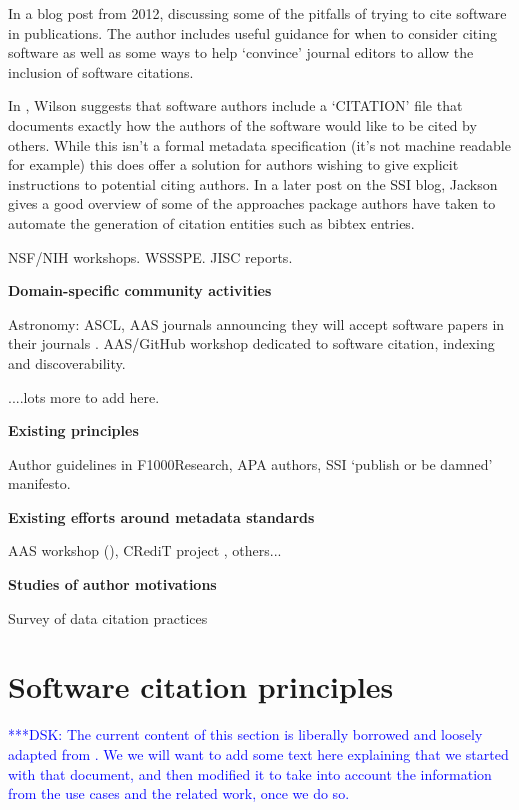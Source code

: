 \documentclass[11pt, oneside]{amsart}
\newcommand{\katznote}[1]{ {\textcolor{blue} { ***DSK: #1 }}}
\begin{document}
In a blog post from 2012, \cite{ssi-how-to-cite} discussing some of the pitfalls of trying to cite software in publications.
The author includes useful guidance for when to consider citing software as well as some ways to help `convince' journal editors
to allow the inclusion of software citations.

In \cite{ssi-citation-files}, Wilson suggests that software authors include a `CITATION' file that documents exactly how the
authors of the software would like to be cited by others. While this isn't a formal metadata specification (it's not machine
readable for example) this does offer a solution for authors wishing to give explicit instructions to potential citing authors.
In a later post on the SSI blog, Jackson \cite{ssi-how-shalt-i-cite-thee} gives a good overview of some of the approaches
package authors have taken to automate the generation of citation entities such as bibtex entries.

NSF/NIH workshops. WSSSPE. JISC reports.

\textbf{Domain-specific community activities}

Astronomy: ASCL, AAS journals announcing they will accept software papers in their journals \cite{aas-sofware-papers}. AAS/GitHub
workshop \cite{aas-software-index} dedicated to software citation, indexing and discoverability.

....lots more to add here.

\textbf{Existing principles}

Author guidelines in F1000Research, APA authors, SSI `publish or be damned' \cite{ssi-publish-or-be-damned} manifesto.

\textbf{Existing efforts around metadata standards}

AAS workshop (\cite{aas-software-index}), CRediT project \cite{casrai-credit}, others...

\textbf{Studies of author motivations}

Survey of data citation practices \cite{Kratz_2015}




\section{Software citation principles}
\label{sec:principles}

\katznote{The current content of this section is liberally borrowed and loosely adapted from \cite{data-citation-principles}.  We we will want to add some text here explaining that we started with that document, and then modified it to take into account the information from the use cases and the related work, once we do so.}
\end{document}
